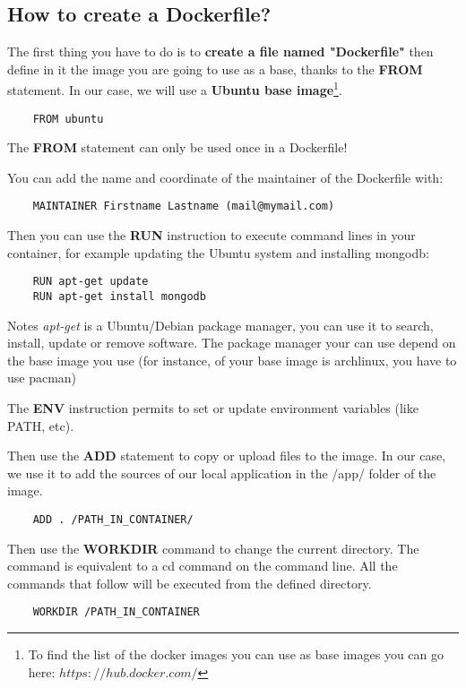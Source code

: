 \documentclass[handout]{beamer}[10pt, usepdftitle=false]
\begin{document}
	\subsection{How to create a Dockerfile?}
	\begin{frame}[fragile]
	The first thing you have to do is to \textbf{create a file named "Dockerfile"} then define in it the image you are going to use as a base, thanks to the \textbf{FROM} statement. In our case, we will use a \textbf{Ubuntu base image}\footnote{To find the list of the docker images you can use as base images you can go here: $https://hub.docker.com/$}.
	
	\begin{verbatim}
	FROM ubuntu
	\end{verbatim}
	
	The \textbf{FROM} statement can only be used once in a Dockerfile!
	
	You can add the name and coordinate of the maintainer of the Dockerfile with:
	\begin{verbatim}
	MAINTAINER Firstname Lastname (mail@mymail.com)	
	\end{verbatim}

	\end{frame}
	\begin{frame}[fragile]
	Then you can use the \textbf{RUN} instruction to execute command lines in your container, for example updating the Ubuntu system and installing mongodb:
	
	\begin{verbatim}
	RUN apt-get update 
	RUN apt-get install mongodb 
	\end{verbatim}

	\begin{block}{Notes}
	\textit{apt-get} is a Ubuntu/Debian package manager, you can use it to search, install, update or remove software. The package manager your can use depend on the base image you use (for instance, of your base image is archlinux, you have to use pacman)
	\end{block}

	The \textbf{ENV} instruction permits to set or update environment variables (like PATH, etc).	
	
	\end{frame}
	\begin{frame}[fragile]
	
	Then use the \textbf{ADD} statement to copy or upload files to the image. In our case, we use it to add the sources of our local application in the /app/ folder of the image.
	\vspace*{0.6em}	
	
	\begin{verbatim}
	ADD . /PATH_IN_CONTAINER/
	\end{verbatim}
	
	Then use the \textbf{WORKDIR} command to change the current directory. The command is equivalent to a cd command on the command line. All the commands that follow will be executed from the defined directory.
	\begin{verbatim}
	WORKDIR /PATH_IN_CONTAINER	
	\end{verbatim}		
	
	\end{frame}
\end{document}
